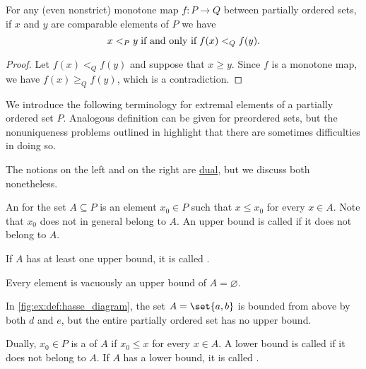 \begin{proposition}\label{thm:monotone_map_converse}
  For any (even nonstrict) monotone map \( f: P \to Q \) between partially ordered sets, if \( x \) and \( y \) are comparable elements of \( P \) we have
  \begin{equation}\label{eq:thm:monotone_map_converse}
    x <_P y \T{if and only if} f(x) <_Q f(y).
  \end{equation}
\end{proposition}
\begin{proof}
  Let \( f(x) <_Q f(y) \) and suppose that \( x \geq y \). Since \( f \) is a monotone map, we have \( f(x) \geq_Q f(y) \), which is a contradiction.
\end{proof}

\begin{definition}\label{def:partially_ordered_set_extremal_points}
  We introduce the following terminology for extremal elements of a partially ordered set \( P \). Analogous definition can be given for preordered sets, but the nonuniqueness problems outlined in  highlight that there are sometimes difficulties in doing so.

  The notions on the left and on the right are \hyperref[def:partially_ordered_set/duality]{dual}, but we discuss both nonetheless.

  \begin{thmenum}
    \begin{minipage}[t]{0.45\textwidth}
      An  for the set \( A \subseteq P \) is an element \( x_0 \in P \) such that \( x \leq x_0 \) for every \( x \in A \). Note that \( x_0 \) does not in general belong to \( A \). An upper bound is called  if it does not belong to \( A \).

      If \( A \) has at least one upper bound, it is called .

      Every element is vacuously an upper bound of \( A = \varnothing \).

      In \cref{fig:ex:def:hasse_diagram}, the set \( A = \set{ a, b } \) is bounded from above by both \( d \) and \( e \), but the entire partially ordered set has no upper bound.
    \end{minipage}
    \hspace{0.02\textwidth}
    \begin{minipage}[t]{0.45\textwidth}
      Dually, \( x_0 \in P \) is a  of \( A \) if \( x_0 \leq x \) for every \( x \in A \). A lower bound is called  if it does not belong to \( A \). If \( A \) has a lower bound, it is called .


\end{minipage}
\end{thmenum}
\end{definition}
